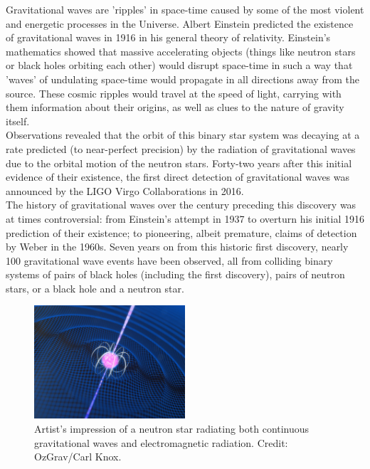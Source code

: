 Gravitational waves are 'ripples' in space-time caused by some of the most violent and energetic processes in the Universe. Albert Einstein predicted the existence of gravitational waves in 1916 in his general theory of relativity. Einstein's mathematics showed that massive accelerating objects (things like neutron stars or black holes orbiting each other) would disrupt space-time in such a way that 'waves' of undulating space-time would propagate in all directions away from the source. These cosmic ripples would travel at the speed of light, carrying with them information about their origins, as well as clues to the nature of gravity itself.\\

Observations revealed that the orbit of this binary star system was decaying at a rate predicted (to near-perfect precision) by the radiation of gravitational waves due to the orbital motion of the neutron stars. Forty-two years after this initial evidence of their existence, the first direct detection of gravitational waves was announced by the LIGO Virgo Collaborations in 2016.\\

The history of gravitational waves over the century preceding this discovery was at times controversial: from Einstein’s attempt in 1937 to overturn his initial 1916 prediction of their existence; to pioneering, albeit premature, claims of detection by Weber in the 1960s. Seven years on from this historic first discovery, nearly 100 gravitational wave events have been observed, all from colliding binary systems of pairs of black holes (including the first discovery), pairs of neutron stars, or a black hole and a neutron star.\\

\begin{figure}[h]
\centering
\includegraphics[height=0.4\textwidth, width=0.5\textwidth]{images/Continous gravitational wave.jpg}
\caption{\small Artist’s impression of a neutron star radiating both continuous gravitational waves and electromagnetic radiation. Credit: OzGrav/Carl Knox.}
\end{figure}

